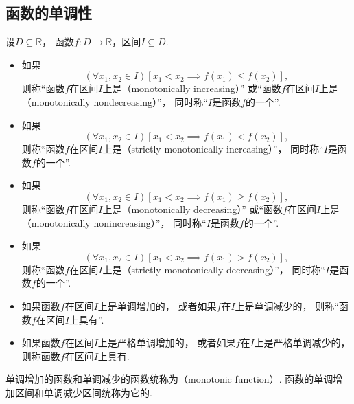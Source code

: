 \subsection{函数的单调性}
\begin{definition}\label{definition:函数的性质.单调性}
设\(D\subseteq\mathbb{R}\)，
函数\(f\colon D\to\mathbb{R}\)，区间\(I \subseteq D\).
\begin{itemize}
	\item 如果\begin{equation*}
		(\forall x_1,x_2\in I)
		[x_1 < x_2 \implies f(x_1) \leq f(x_2)],
	\end{equation*}
	则称“函数\(f\)在区间\(I\)上是（monotonically increasing）”
	或“函数\(f\)在区间\(I\)上是（monotonically nondecreasing）”，
	同时称“\(I\)是函数\(f\)的一个”.

	\item 如果\begin{equation*}
		(\forall x_1,x_2\in I)
		[x_1 < x_2 \implies f(x_1) < f(x_2)],
	\end{equation*}
	则称“函数\(f\)在区间\(I\)上是（strictly monotonically increasing）”，
	同时称“\(I\)是函数\(f\)的一个”.

	\item 如果\begin{equation*}
		(\forall x_1,x_2\in I)
		[x_1 < x_2 \implies f(x_1) \geq f(x_2)],
	\end{equation*}
	则称“函数\(f\)在区间\(I\)上是（monotonically decreasing）”
	或“函数\(f\)在区间\(I\)上是（monotonically nonincreasing）”，
	同时称“\(I\)是函数\(f\)的一个”.

	\item 如果\begin{equation*}
		(\forall x_1,x_2\in I)
		[x_1 < x_2 \implies f(x_1) > f(x_2)],
	\end{equation*}
	则称“函数\(f\)在区间\(I\)上是（strictly monotonically decreasing）”，
	同时称“\(I\)是函数\(f\)的一个”.

	\item 如果函数\(f\)在区间\(I\)上是单调增加的，
	或者如果\(f\)在\(I\)上是单调减少的，
	则称“函数\(f\)在区间\(I\)上具有”.

	\item 如果函数\(f\)在区间\(I\)上是严格单调增加的，
	或者如果\(f\)在\(I\)上是严格单调减少的，
	则称函数\(f\)在区间\(I\)上具有.
\end{itemize}

单调增加的函数和单调减少的函数统称为（monotonic function）.
函数的单调增加区间和单调减少区间统称为它的.
\end{definition}

